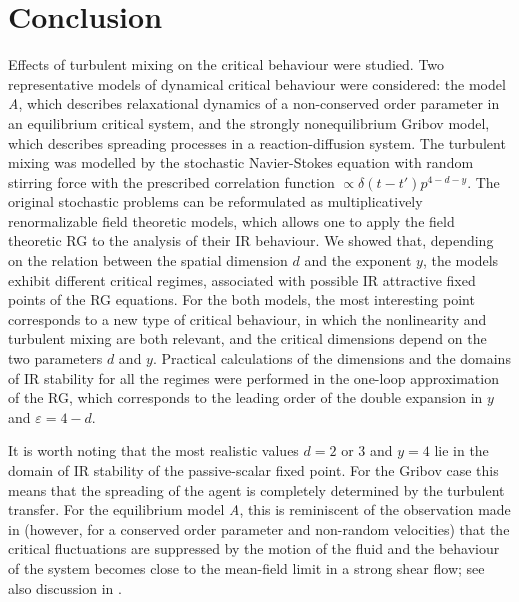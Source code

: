 \documentclass[12pt]{iopart}
\begin{document}
\section{Conclusion} \label{sec:Conc}

Effects of turbulent mixing on the critical behaviour were studied. Two
representative models of dynamical critical behaviour were considered:
the model {\it A}, which describes relaxational dynamics of a non-conserved
order parameter in an equilibrium critical system, and the strongly
nonequilibrium Gribov model, which describes spreading processes in
a reaction-diffusion system. The turbulent mixing was modelled by the
stochastic Navier-Stokes equation with random stirring force with the
prescribed correlation function $\propto \delta(t-t') p^{4-d-y}$.
The original stochastic problems can be reformulated as multiplicatively
renormalizable field theoretic models, which allows one to apply the field
theoretic RG to the analysis of their IR behaviour.
We showed that, depending on the relation between the spatial dimension
$d$ and the exponent $y$, the models exhibit different critical
regimes, associated with possible IR attractive fixed points of the RG
equations. For the both models, the most interesting point corresponds to
a new type of critical behaviour, in which the nonlinearity and turbulent
mixing are both relevant, and the critical dimensions depend on the two
parameters $d$ and $y$. Practical calculations of the dimensions and the
domains of IR stability for all the regimes were performed in the one-loop
approximation of the RG, which corresponds to the leading order of the
double expansion in $y$ and $\varepsilon=4-d$.


It is worth noting that the most realistic values $d=2$ or 3 and $y=4$ lie
in the domain of IR stability of the passive-scalar fixed point. For the
Gribov case this means that the spreading of the agent is completely
determined by the turbulent transfer. For the equilibrium model {\it A},
this is reminiscent of the observation made in \cite{Onuki,Beysens}
(however, for a conserved order parameter and non-random velocities)
that the critical fluctuations are suppressed by the motion of the fluid
and the behaviour of the system becomes close to the mean-field limit in
a strong shear flow; see also discussion in \cite{Chan}.
\end{document}
